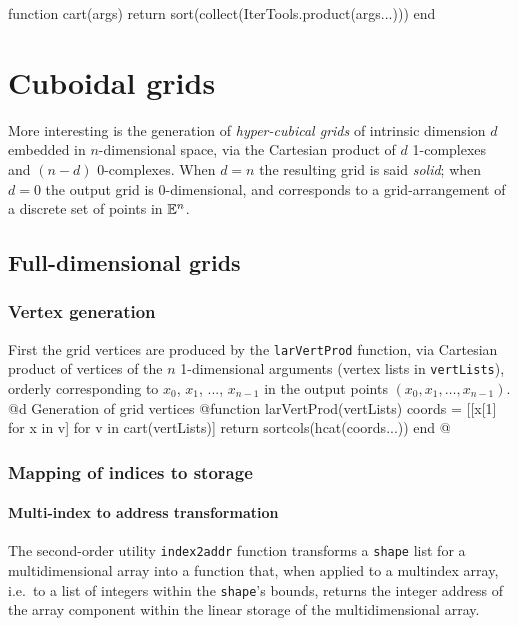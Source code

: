 function cart(args)
	return sort(collect(IterTools.product(args...)))
end



\section{Cuboidal grids}\label{sec:cuboids}

More interesting is the generation of \emph{hyper-cubical grids} of intrinsic dimension $d$ embedded in $n$-dimensional space, via the Cartesian product of $d$ 1-complexes and $(n-d)$ 0-complexes. When $d=n$ the resulting grid is said \emph{solid}; when $d=0$ the output grid is 0-dimensional, and corresponds to a grid-arrangement of a discrete set of points in $\mathbb{E}^n$.


\subsection{Full-dimensional grids}

\subsubsection{Vertex generation}

First the grid vertices are produced by the \texttt{larVertProd} function, via Cartesian product of vertices of the $n$ 1-dimensional arguments (vertex lists in \texttt{vertLists}), orderly corresponding to $x_0$, $x_1$, ..., $x_{n-1}$ in the output points $(x_0, x_1,\ldots,x_{n-1})$.
@d Generation of grid vertices 
@{function larVertProd(vertLists)
	coords = [[x[1] for x in v] for v in cart(vertLists)]
   return sortcols(hcat(coords...))
end
@}




\subsubsection{Mapping of indices to storage}

\paragraph{Multi-index to address transformation}
The second-order utility \texttt{index2addr} function transforms a \texttt{shape} list for a multidimensional array into a function that, when applied to a multindex array, i.e.~to a list of integers within the \texttt{shape}'s bounds, returns the integer address of the array component within the linear storage of the multidimensional array.

